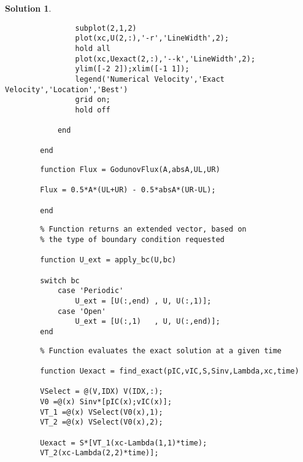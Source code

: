\documentclass[10pt,letterpaper]{article}
\theoremstyle{break}
\newtheorem{solution}{Solution}
\begin{document}
\begin{solution}
\begin{enumerate}
\begin{lstlisting}
				subplot(2,1,2)
				plot(xc,U(2,:),'-r','LineWidth',2);
				hold all
				plot(xc,Uexact(2,:),'--k','LineWidth',2);
				ylim([-2 2]);xlim([-1 1]);
				legend('Numerical Velocity','Exact Velocity','Location','Best')
				grid on;
				hold off
				
			end
			
		end
	\end{lstlisting}

	
	\begin{lstlisting}
		function Flux = GodunovFlux(A,absA,UL,UR)

		Flux = 0.5*A*(UL+UR) - 0.5*absA*(UR-UL);

		end
	\end{lstlisting}

	\begin{lstlisting}
		% Function returns an extended vector, based on
		% the type of boundary condition requested

		function U_ext = apply_bc(U,bc)

		switch bc
			case 'Periodic'
				U_ext = [U(:,end) , U, U(:,1)];
			case 'Open'
				U_ext = [U(:,1)   , U, U(:,end)];
		end
	\end{lstlisting}
	
	\begin{lstlisting}
		% Function evaluates the exact solution at a given time

		function Uexact = find_exact(pIC,vIC,S,Sinv,Lambda,xc,time)

		VSelect = @(V,IDX) V(IDX,:);
		V0 =@(x) Sinv*[pIC(x);vIC(x)];
		VT_1 =@(x) VSelect(V0(x),1);
		VT_2 =@(x) VSelect(V0(x),2);

		Uexact = S*[VT_1(xc-Lambda(1,1)*time);
		VT_2(xc-Lambda(2,2)*time)];
	\end{lstlisting}
	

	\end{enumerate}
\end{solution}
	
\end{document}
